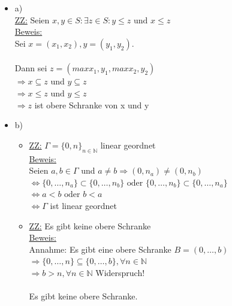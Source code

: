 \documentclass[a4paper]{scrartcl}
\begin{document}
    \begin{itemize}
        \item a)\\
            \underline{ZZ:} Seien $x,y \in S: \exists z \in S: y \leq z \text{ und } x \leq z$\\
            \underline{Beweis:}\\
                Sei $x = (x_1,x_2), y = (y_1,y_2).$\\
                \\Dann sei $z = (max{x_1,y_1}, max{x_2,y_2})$\\
                $\Rightarrow x \subseteq z$ und $y \subseteq z$\\
                $\Rightarrow x \leq z \text{ und } y \leq z$\\
                $\Rightarrow z$ ist obere Schranke von x und y\\

        \item b)\\
            \begin{itemize}
                \item \underline{ZZ:} $\Gamma = \{0,n\}_{n \in \mathds{N}}$ linear geordnet\\
                    \underline{Beweis:}\\
                    Seien $a,b \in \Gamma$ und $a \neq b \Rightarrow (0,n_a) \neq (0,n_b)$\\
                    $\Leftrightarrow \{0,\dots,n_a\} \subset \{0,\dots,n_b\} \text{ oder } \{0,\dots,n_b\} \subset \{0,\dots,n_a\}$\\
                    $\Leftrightarrow a < b \text{ oder } b < a$\\
                    $\Leftrightarrow \Gamma$ ist linear geordnet

                \item \underline{ZZ:} Es gibt keine obere Schranke\\
                    \underline{Beweis:}\\
                        Annahme: Es gibt eine obere Schranke $B = (0,\dots,b)$\\
                        $\Rightarrow \{0,\dots,n\} \subseteq \{0,\dots,b\}, \forall n \in \mathds{N}$\\
                        $\Rightarrow b > n, \forall n \in \mathds{N}$ Widerspruch!\\
                        \\Es gibt keine obere Schranke.\\


\end{itemize}
\end{itemize}
\end{document}
